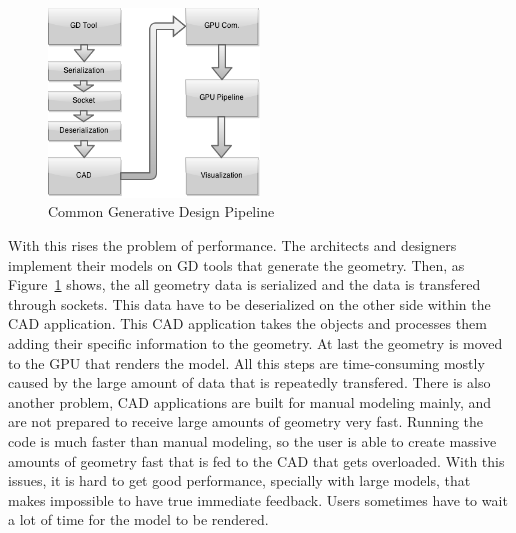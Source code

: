 \begin{figure}
	\vspace{-15pt}
    \centering
	\includegraphics[width=0.5\textwidth]{img/Architecture/GD-Common-Pipeline.png}
	\caption{Common Generative Design Pipeline}
	\label{fig:GD_Pipeline}
	\vspace{-35pt}
\end{figure}

With this rises the problem of performance. The architects and designers implement their models on GD tools that generate the geometry. Then, as Figure~\ref{fig:GD_Pipeline} shows, the all geometry data is serialized and the data is transfered through sockets. This data have to be deserialized on the other side within the CAD application. This CAD application takes the objects and processes them adding their specific information to the geometry. At last the geometry is moved to the GPU that renders the model. All this steps are time-consuming mostly caused by the large amount of data that is repeatedly transfered. There is also another problem, CAD applications are built for manual modeling mainly, and are not prepared to receive large amounts of geometry very fast. Running the code is much faster than manual modeling, so the user is able to create massive amounts of geometry fast that is fed to the CAD that gets overloaded. With this issues, it is hard to get good performance, specially with large models, that makes impossible to have true immediate feedback. Users sometimes have to wait a lot of time for the model to be rendered.


